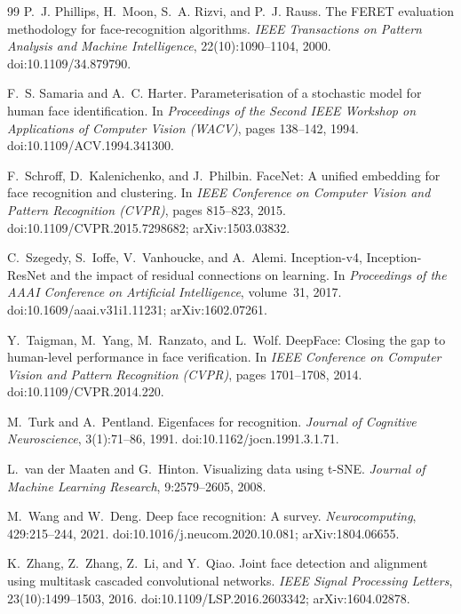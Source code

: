 \begin{thebibliography}{99}
P.~J. Phillips, H.~Moon, S.~A. Rizvi, and P.~J. Rauss.
\newblock The FERET evaluation methodology for face-recognition algorithms.
\newblock \emph{IEEE Transactions on Pattern Analysis and Machine Intelligence}, 22(10):1090--1104, 2000.
\newblock doi:10.1109/34.879790.

F.~S. Samaria and A.~C. Harter.
\newblock Parameterisation of a stochastic model for human face identification.
\newblock In \emph{Proceedings of the Second IEEE Workshop on Applications of Computer Vision (WACV)}, pages 138--142, 1994.
\newblock doi:10.1109/ACV.1994.341300.

F.~Schroff, D.~Kalenichenko, and J.~Philbin.
\newblock FaceNet: A unified embedding for face recognition and clustering.
\newblock In \emph{IEEE Conference on Computer Vision and Pattern Recognition (CVPR)}, pages 815--823, 2015.
\newblock doi:10.1109/CVPR.2015.7298682; arXiv:1503.03832.

C.~Szegedy, S.~Ioffe, V.~Vanhoucke, and A.~Alemi.
\newblock Inception-v4, Inception-ResNet and the impact of residual connections on learning.
\newblock In \emph{Proceedings of the AAAI Conference on Artificial Intelligence}, volume~31, 2017.
\newblock doi:10.1609/aaai.v31i1.11231; arXiv:1602.07261.

Y.~Taigman, M.~Yang, M.~Ranzato, and L.~Wolf.
\newblock DeepFace: Closing the gap to human-level performance in face verification.
\newblock In \emph{IEEE Conference on Computer Vision and Pattern Recognition (CVPR)}, pages 1701--1708, 2014.
\newblock doi:10.1109/CVPR.2014.220.

M.~Turk and A.~Pentland.
\newblock Eigenfaces for recognition.
\newblock \emph{Journal of Cognitive Neuroscience}, 3(1):71--86, 1991.
\newblock doi:10.1162/jocn.1991.3.1.71.

L.~van der Maaten and G.~Hinton.
\newblock Visualizing data using t-SNE.
\newblock \emph{Journal of Machine Learning Research}, 9:2579--2605, 2008.

M.~Wang and W.~Deng.
\newblock Deep face recognition: A survey.
\newblock \emph{Neurocomputing}, 429:215--244, 2021.
\newblock doi:10.1016/j.neucom.2020.10.081; arXiv:1804.06655.

K.~Zhang, Z.~Zhang, Z.~Li, and Y.~Qiao.
\newblock Joint face detection and alignment using multitask cascaded convolutional networks.
\newblock \emph{IEEE Signal Processing Letters}, 23(10):1499--1503, 2016.
\newblock doi:10.1109/LSP.2016.2603342; arXiv:1604.02878.

\end{thebibliography}
